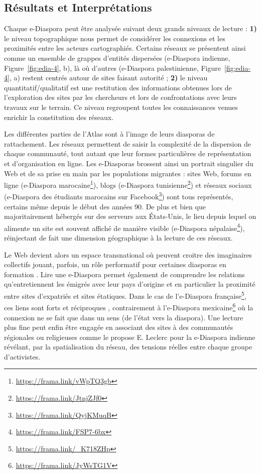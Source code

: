 \documentclass[symmetric,justified,marginals=raggedouter]{tufte-book}
\begin{document}
\subsection{Résultats et Interprétations}

\noindent Chaque e-Diaspora peut être analysée suivant deux grands niveaux de lecture : \textbf{1)} le niveau topographique nous permet de considérer les connexions et les proximités entre les acteurs cartographiés. Certains réseaux se présentent ainsi comme un ensemble de grappes d'entités dispersées (e-Diaspora indienne, Figure~\ref{fig:edia-4}, b), là où d'autres (e-Diaspora palestinienne, Figure~\ref{fig:edia-4}, a) restent centrés autour de sites faisant autorité \citep{ben-david_palestinian_2012}; \textbf{2)} le niveau quantitatif/qualitatif est une restitution des informations obtenues lors de l'exploration des sites par les chercheurs et lors de confrontations avec leurs travaux sur le terrain. Ce niveau regroupent toutes les connaissances venues enrichir la constitution des réseaux.

Les différentes parties de l'Atlas sont à l'image de leurs diasporas de rattachement. Les réseaux permettent de saisir la complexité de la dispersion de chaque communauté, tout autant que leur formes particulières de représentation et d'organisation en ligne. Les e-Diasporas brossent ainsi un portrait singulier du Web et de sa prise en main par les populations migrantes : sites Web, forums en ligne (e-Diaspora marocaine\footnote{\RaggedOuter \url{https://frama.link/vWpTQ3gb}}), blogs (e-Diaspora tunisienne\footnote{\RaggedOuter \url{https://frama.link/JtnjZJf0}}) et réseaux sociaux (e-Diaspora des étudiants marocains sur Facebook\footnote{\RaggedOuter \url{https://frama.link/QyjKMuqB}}) sont tous représentés, certains même depuis le début des années 90. De plus et bien que majoritairement hébergés sur des serveurs aux États-Unis, le lieu depuis lequel on alimente un site est souvent affiché de manière visible (e-Diaspora népalaise\footnote{\RaggedOuter \url{https://frama.link/FSP7-6bx}}), réinjectant de fait une dimension géographique à la lecture de ces réseaux.

Le Web devient alors un espace transnational où peuvent croitre des imaginaires collectifs jouant, parfois, un rôle performatif pour certaines diasporas en formation \citep{brusle_les_2012}. Lire une e-Diaspora permet également de comprendre les relations qu'entretiennent les émigrés avec leur pays d'origine et en particulier la proximité entre sites d'expatriés et sites étatiques. Dans le cas de l'e-Diaspora française\footnote{\RaggedOuter \url{https://frama.link/_K718ZHp}}, ces liens sont forts et réciproques \citep{berthomiere_french_2013}, contrairement à l'e-Diaspora mexicaine\footnote{\RaggedOuter \url{https://frama.link/JyWsTG1V}} où la connexion ne se fait que dans un sens (de l'état vers la diaspora). Une lecture plus fine peut enfin être engagée en associant des sites à des communautés régionales ou religieuses comme le propose E. Leclerc pour la e-Diaspora indienne \citep{leclerc_cyberespace_2012} révélant, par la spatialisation du réseau, des tensions réelles entre chaque groupe d'activistes. 
\end{document}
